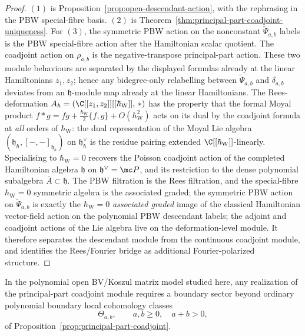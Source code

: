 \documentclass[11pt]{memoir}
\begin{document}
\begin{proof}
  $(1)$ is Proposition~\ref{prop:open-descendant-action}, with the
  rephrasing in the PBW special-fibre basis. $(2)$ is
  Theorem~\ref{thm:principal-part-coadjoint-uniqueness}. For $(3)$, the
	  symmetric PBW action on the nonconstant
	  \(\widetilde\Psi_{a,b}\) labels is the PBW special-fibre action after
	  the Hamiltonian scalar quotient. The coadjoint action on
	  $\rho_{a,b}$ is the negative-transpose principal-part action. These two module behaviours are
	  separated by the displayed formulas already at the linear
  Hamiltonians $z_1,z_2$; hence any bidegree-only relabelling between
  $\widetilde\Psi_{a,b}$ and $\delta_{a,b}$ deviates from an
  $\mathfrak h$-module map already at the linear Hamiltonians. The Rees-deformation
	  \(A_\hbar=(\C[[z_1,z_2]][[\hbar_{\mathrm{W}}]],\,*)\) has the property that the
	  formal Moyal product
	  \(f*g=fg+\frac{\hbar_{\mathrm{W}}}{2}\{f,g\}+O(\hbar_{\mathrm{W}}^2)\) acts on its dual by the
	  coadjoint formula at \emph{all} orders of \(\hbar_{\mathrm{W}}\): the dual
  representation of the Moyal Lie algebra
  $(\mathfrak h_\hbar,[-,-]_{\mathfrak h_\hbar})$ on
	  $\mathfrak h_\hbar^\vee$ is the residue pairing extended
	  \(\C[[\hbar_{\mathrm{W}}]]\)-linearly. Specialising to \(\hbar_{\mathrm{W}}=0\) recovers the
  Poisson coadjoint action of the completed Hamiltonian algebra
  $\mathfrak h$ on $\mathfrak h^\vee=\mc P$, and its restriction to the
  dense polynomial subalgebra $\bar A\subset\mathfrak h$. The PBW
  filtration is the Rees filtration,
	  and the special-fibre \(\hbar_{\mathrm{W}}=0\) symmetric algebra is the associated
	  graded; the symmetric PBW action on $\widetilde\Psi_{a,b}$ is
	  exactly the \(\hbar_{\mathrm{W}}=0\) \emph{associated graded} image of the
  classical Hamiltonian vector-field action on the polynomial PBW
  descendant labels; the adjoint and coadjoint actions of the Lie
  algebra live on the deformation-level module. It therefore separates
  the descendant module from the continuous coadjoint module, and
  identifies the Rees/Fourier bridge as additional Fourier-polarized
  structure.
\end{proof}

\begin{prop}\label{prop:polynomial-principal-part-boundary-obstruction}
  In the polynomial open BV/Koszul matrix model studied here, any realization
  of the principal-part coadjoint module requires a boundary sector beyond
  ordinary polynomial boundary local cohomology classes
  $$\Theta_{a,b},\qquad a,b\geq0,\quad a+b>0,$$
  of
  Proposition~\ref{prop:principal-part-coadjoint}.
\end{prop}
\end{document}
